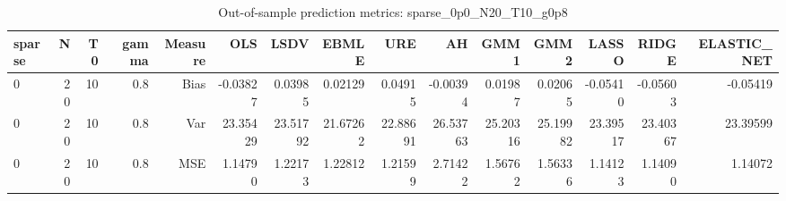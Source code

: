 \begin{table}[!htbp]\centering
\caption{Out-of-sample prediction metrics: sparse_0p0_N20_T10_g0p8}
\label{tab:table3_sparse_0p0_N20_T10_g0p8}
\begin{tabular}{lrrrrrrrrrrrrrr}
\hline
sparse & N & T0 & gamma & Measure & OLS & LSDV & EBMLE & URE & AH & GMM1 & GMM2 & LASSO & RIDGE & ELASTIC_NET \\
\hline
0 & 20 & 10 & 0.8 & Bias & -0.03827 & 0.03985 & 0.02129 & 0.04915 & -0.00394 & 0.01987 & 0.02065 & -0.05410 & -0.05603 & -0.05419 \\
0 & 20 & 10 & 0.8 & Var & 23.35429 & 23.51792 & 21.67262 & 22.88691 & 26.53763 & 25.20316 & 25.19982 & 23.39517 & 23.40367 & 23.39599 \\
0 & 20 & 10 & 0.8 & MSE & 1.14790 & 1.22173 & 1.22812 & 1.21599 & 2.71422 & 1.56762 & 1.56336 & 1.14123 & 1.14090 & 1.14072 \\
\hline
\end{tabular}
\end{table}

